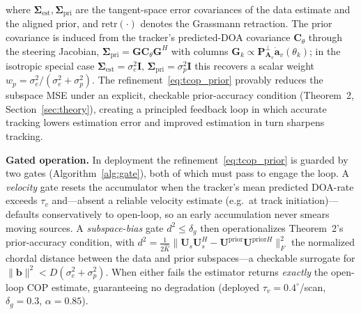 \documentclass[journal]{IEEEtran}
\newcommand{\mat}[1]{\mathbf{#1}}
\begin{document}
where $\mat{\Sigma}_{\mathrm{est}},\mat{\Sigma}_{\mathrm{pri}}$ are the tangent-space error covariances of the data estimate and the aligned prior, and $\mathrm{retr}(\cdot)$ denotes the Grassmann retraction. The prior covariance is induced from the tracker's predicted-DOA covariance $\mat{C}_\theta$ through the steering Jacobian, $\mat{\Sigma}_{\mathrm{pri}}=\mat{G}\mat{C}_\theta\mat{G}^H$ with columns $\mat{G}_k\propto\mat{P}_{\mat{A}_v}^\perp\dot{\mat{a}}_v(\theta_k)$; in the isotropic special case $\mat{\Sigma}_{\mathrm{est}}=\sigma_e^2\mat{I},\,\mat{\Sigma}_{\mathrm{pri}}=\sigma_p^2\mat{I}$ this recovers a scalar weight $w_p=\sigma_e^2/(\sigma_e^2+\sigma_p^2)$. The refinement~\eqref{eq:tcop_prior} provably reduces the subspace MSE under an explicit, checkable prior-accuracy condition (Theorem~2, Section~\ref{sec:theory}), creating a principled feedback loop in which accurate tracking lowers estimation error and improved estimation in turn sharpens tracking.

\textbf{Gated operation.} In deployment the refinement~\eqref{eq:tcop_prior} is guarded by two gates (Algorithm~\ref{alg:gate}), both of which must pass to engage the loop. A \emph{velocity} gate resets the accumulator when the tracker's mean predicted DOA-rate exceeds $\tau_v$ and---absent a reliable velocity estimate (e.g.\ at track initiation)---defaults conservatively to open-loop, so an early accumulation never smears moving sources. A \emph{subspace-bias} gate $d^2\le\delta_g$ then operationalizes Theorem~2's prior-accuracy condition, with $d^2=\tfrac{1}{2\hat K}\|\mat{U}_s\mat{U}_s^H-\mat{U}^{\mathrm{prior}}\mat{U}^{\mathrm{prior}H}\|_F^2$ the normalized chordal distance between the data and prior subspaces---a checkable surrogate for $\|\mat{b}\|^2<D(\sigma_e^2+\sigma_p^2)$. When either fails the estimator returns \emph{exactly} the open-loop COP estimate, guaranteeing no degradation (deployed $\tau_v=0.4^\circ$/scan, $\delta_g=0.3$, $\alpha=0.85$).
\end{document}
